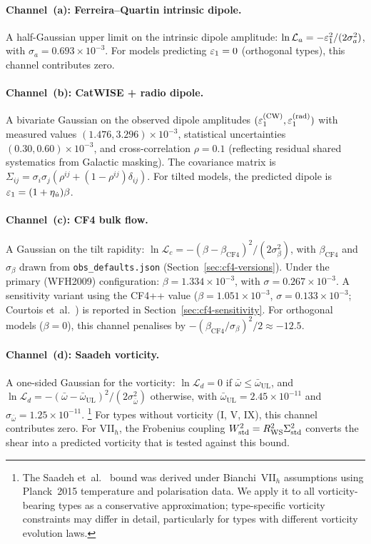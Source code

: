 \paragraph{Channel~(a): Ferreira--Quartin intrinsic dipole.}
A half-Gaussian upper limit on the intrinsic dipole amplitude:
$\ln\mathcal{L}_a = -\varepsilon_1^2/(2\sigma_a^2)$, with
$\sigma_a = 0.693 \times 10^{-3}$.  For models predicting
$\varepsilon_1 = 0$ (orthogonal types), this channel contributes zero.

\paragraph{Channel~(b): CatWISE + radio dipole.}
A bivariate Gaussian on the observed dipole amplitudes
$(\varepsilon_1^{(\mathrm{CW})}, \varepsilon_1^{(\mathrm{rad})})$ with
measured values $(1.476, 3.296) \times 10^{-3}$, statistical
uncertainties $(0.30, 0.60) \times 10^{-3}$, and
cross-correlation $\rho = 0.1$ (reflecting residual shared
systematics from Galactic masking).  The covariance matrix is
$\Sigma_{ij} = \sigma_i\sigma_j(\rho^{ij} + (1-\rho^{ij})
\delta_{ij})$.  For tilted models, the predicted dipole is
$\varepsilon_1 = (1 + \eta_{\dot{u}})\beta$.

\paragraph{Channel~(c): CF4 bulk flow.}
A Gaussian on the tilt rapidity:
$\ln\mathcal{L}_c = -(\beta - \beta_{\mathrm{CF4}})^2/
(2\sigma_\beta^2)$, with $\beta_{\mathrm{CF4}}$ and
$\sigma_\beta$ drawn from \texttt{obs\_defaults.json}
(Section~\ref{sec:cf4-versions}).  Under the primary (WFH2009)
configuration: $\beta = 1.334 \times 10^{-3}$, with
$\sigma = 0.267 \times 10^{-3}$.  A sensitivity variant using
the CF4++ value ($\beta = 1.051 \times 10^{-3}$,
$\sigma = 0.133 \times 10^{-3}$;
Courtois et~al.~\cite{Courtois2025}) is reported in
Section~\ref{sec:cf4-sensitivity}.  For orthogonal models
($\beta = 0$), this channel penalises by
$-(\beta_{\mathrm{CF4}}/\sigma_\beta)^2/2 \approx -12.5$.

\paragraph{Channel~(d): Saadeh vorticity.}
A one-sided Gaussian for the vorticity:
$\ln\mathcal{L}_d = 0$ if
$\bar{\omega} \leq \bar{\omega}_{\mathrm{UL}}$, and
$\ln\mathcal{L}_d = -(\bar{\omega} -
\bar{\omega}_{\mathrm{UL}})^2/(2\sigma_{\bar{\omega}}^2)$
otherwise, with $\bar{\omega}_{\mathrm{UL}} = 2.45 \times
10^{-11}$ and $\sigma_{\bar{\omega}} = 1.25 \times 10^{-11}$.%
\footnote{The Saadeh et~al.~\cite{Saadeh2016b} bound was derived
under Bianchi~VII$_h$ assumptions using Planck~2015 temperature
and polarisation data.  We apply it to all vorticity-bearing
types as a conservative approximation; type-specific vorticity
constraints may differ in detail, particularly for types with
different vorticity evolution laws.}
For types without vorticity (I, V, IX), this channel
contributes zero.  For VII$_h$, the Frobenius coupling
$W^2_{\mathrm{std}} = R_{\mathrm{WS}}^2\Sigma^2_{\mathrm{std}}$ converts the shear into a
predicted vorticity that is tested against this bound.

